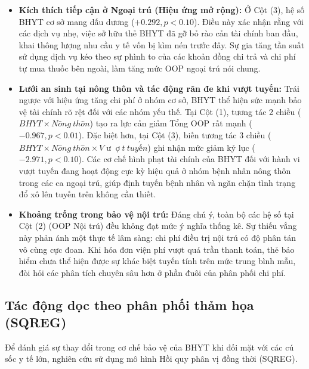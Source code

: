 \documentclass[12pt,a4paper]{article}
\begin{document}
\begin{itemize}
	\item \textbf{Kích thích tiếp cận ở Ngoại trú (Hiệu ứng mở rộng):} Ở Cột (3), hệ số BHYT cơ sở mang dấu dương ($+0.292, p < 0.10$). Điều này xác nhận rằng với các dịch vụ nhẹ, việc sở hữu thẻ BHYT đã gỡ bỏ rào cản tài chính ban đầu, khai thông lượng nhu cầu y tế vốn bị kìm nén trước đây. Sự gia tăng tần suất sử dụng dịch vụ kéo theo sự phình to của các khoản đồng chi trả và chi phí tự mua thuốc bên ngoài, làm tăng mức OOP ngoại trú nói chung.
	
	\item \textbf{Lưới an sinh tại nông thôn và tác động răn đe khi vượt tuyến:} Trái ngược với hiệu ứng tăng chi phí ở nhóm cơ sở, BHYT thể hiện sức mạnh bảo vệ tài chính rõ rệt đối với các nhóm yếu thế. Tại Cột (1), tương tác 2 chiều ($BHYT \times N\hat{o}ng\ th\hat{o}n$) tạo ra lực cản giảm Tổng OOP rất mạnh ($-0.967, p < 0.01$). Đặc biệt hơn, tại Cột (3), biến tương tác 3 chiều ($BHYT \times N\hat{o}ng\ th\hat{o}n \times V\mathopen{ư}\mathclose{ợ}t\ tuy\acute{ế}n$) ghi nhận mức giảm kỷ lục ($-2.971, p < 0.10$). Các cơ chế hình phạt tài chính của BHYT đối với hành vi vượt tuyến đang hoạt động cực kỳ hiệu quả ở nhóm bệnh nhân nông thôn trong các ca ngoại trú, giúp định tuyến bệnh nhân và ngăn chặn tình trạng đổ xô lên tuyến trên không cần thiết.
	
	\item \textbf{Khoảng trống trong bảo vệ nội trú:} Đáng chú ý, toàn bộ các hệ số tại Cột (2) (OOP Nội trú) đều không đạt mức ý nghĩa thống kê. Sự thiếu vắng này phản ánh một thực tế lâm sàng: chi phí điều trị nội trú có độ phân tán vô cùng cực đoan. Khi hóa đơn viện phí vượt quá trần thanh toán, thẻ bảo hiểm chưa thể hiện được sự khác biệt tuyến tính trên mức trung bình mẫu, đòi hỏi các phân tích chuyên sâu hơn ở phần đuôi của phân phối chi phí.
\end{itemize}

\clearpage
\subsection{Tác động dọc theo phân phối thảm họa (SQREG)}

Để đánh giá sự thay đổi trong cơ chế bảo vệ của BHYT khi đối mặt với các cú sốc y tế lớn, nghiên cứu sử dụng mô hình Hồi quy phân vị đồng thời (SQREG). 
\end{document}
